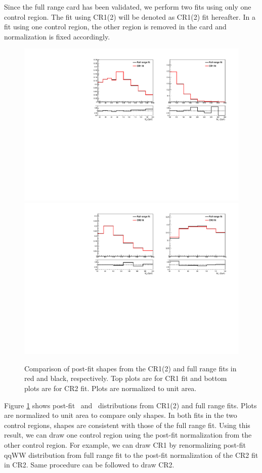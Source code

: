 Since the full range card has been validated, we perform two fits using only one control region.
The fit using CR1(2) will be denoted as CR1(2) fit hereafter. In a fit using one control region, 
the other region is removed in the card and normalization is fixed accordingly. 
\begin{figure}[!hbtp]
\centering
\includegraphics[width=.8\textwidth]{figures/1Dshape_CR1_plotCR1.pdf} \\
\includegraphics[width=.8\textwidth]{figures/1Dshape_CR2_plotCR2.pdf} 
\caption{Comparison of post-fit shapes from the CR1(2) and full range fits in 
red and black, respectively. Top plots are for CR1 fit and bottom plots are 
for CR2 fit. Plots are normalized to unit area.}
\label{fig:sanity_fullrangeandcr}
\end{figure}
Figure \ref{fig:sanity_fullrangeandcr} shows post-fit \mt~and \mll~distributions  
from CR1(2) and full range fits. Plots are normalized to unit area to compare only shapes. 
In both fits in the two control regions, shapes are consistent with those of the full range fit.
Using this result, we can draw one control region using the post-fit normalization  
from the other control region. For example, we can draw CR1 by renormalizing
post-fit qqWW distribution from full range fit to the post-fit normalization of the CR2 fit
in CR2. Same procedure can be followed to draw CR2.

